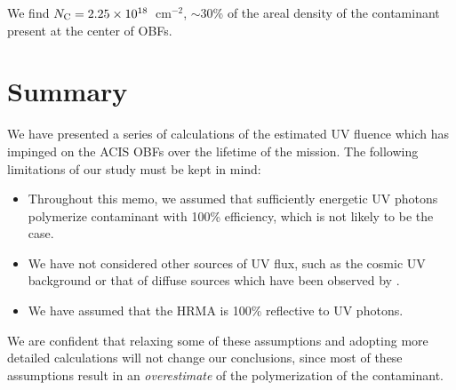 \documentclass[11pt]{article}
\begin{document}
We find $N_{\rm C} = 2.25 \times 10^{18}$~cm$^{-2}$, $\sim$30\% of the areal density of the contaminant present
at the center of OBFs.

\section{Summary}

We have presented a series of calculations of the estimated UV fluence which has impinged on the ACIS OBFs
over the lifetime of the mission. The following limitations of our study must be kept in mind:

\begin{itemize}
\item Throughout this memo, we assumed that sufficiently energetic UV photons polymerize contaminant with 100\% efficiency,
which is not likely to be the case.
\item We have not considered other sources of UV flux, such as the cosmic UV background or that of diffuse sources which
have been observed by \chandra.
\item We have assumed that the HRMA is 100\% reflective to UV photons.
\end{itemize}

We are confident that relaxing some of these assumptions and adopting more detailed calculations will not change our
conclusions, since most of these assumptions result in an {\it overestimate} of the polymerization of the contaminant.
\end{document}
